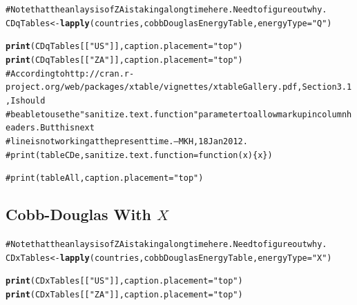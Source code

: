 \documentclass[preprint,authoryear,12pt]{elsarticle}\usepackage{graphicx, color}
\makeatletter
\newcommand{\hlfunctioncall}[1]{\textcolor[rgb]{0.501960784313725,0,0.329411764705882}{\textbf{#1}}}%
\newcommand{\hlstring}[1]{\textcolor[rgb]{0.6,0.6,1}{#1}}%
\newcommand{\hlcomment}[1]{\textcolor[rgb]{0.180392156862745,0.6,0.341176470588235}{#1}}%
\newenvironment{kframe}{%
 \def\at@end@of@kframe{}%
 \ifinner\ifhmode%
  \def\at@end@of@kframe{\end{minipage}}%
  \begin{minipage}{\columnwidth}%
 \fi\fi%
 \def\FrameCommand##1{\hskip\@totalleftmargin \hskip-\fboxsep
 \colorbox{shadecolor}{##1}\hskip-\fboxsep
     \hskip-\linewidth \hskip-\@totalleftmargin \hskip\columnwidth}%
 \MakeFramed {\advance\hsize-\width
   \@totalleftmargin\z@ \linewidth\hsize
   \@setminipage}}%
 {\par\unskip\endMakeFramed%
 \at@end@of@kframe}
\newenvironment{knitrout}{}{} %
\makeatother
\begin{document}
\begin{knitrout}
\color{fgcolor}\begin{kframe}
\begin{alltt}
\hlcomment{# Note that the anlaysis of ZA is taking a long time here. Need to figure out why.}
CDqTables <- \hlfunctioncall{lapply}(countries, cobbDouglasEnergyTable, energyType=\hlstring{"Q"})
\end{alltt}
\end{kframe}
\end{knitrout}


\begin{kframe}
\begin{alltt}
\hlfunctioncall{print}(CDqTables[[\hlstring{"US"}]], caption.placement=\hlstring{"top"})
\hlfunctioncall{print}(CDqTables[[\hlstring{"ZA"}]], caption.placement=\hlstring{"top"})
\hlcomment{# According to http://cran.r-project.org/web/packages/xtable/vignettes/xtableGallery.pdf, Section 3.1, I should }
\hlcomment{# be able to use the "sanitize.text.function" parameter to allow markup in column headers. But this next}
\hlcomment{# line is not working at the present time. --MKH, 18 Jan 2012.}
\hlcomment{# print(tableCDe, sanitize.text.function = function(x)\{x\})}

\hlcomment{#print(tableAll, caption.placement="top")}
\end{alltt}
\end{kframe}


\subsection{Cobb-Douglas With $X$}

\begin{knitrout}
\color{fgcolor}\begin{kframe}
\begin{alltt}
\hlcomment{# Note that the anlaysis of ZA is taking a long time here. Need to figure out why.}
CDxTables <- \hlfunctioncall{lapply}(countries, cobbDouglasEnergyTable, energyType=\hlstring{"X"})
\end{alltt}
\end{kframe}
\end{knitrout}


\begin{kframe}
\begin{alltt}
\hlfunctioncall{print}(CDxTables[[\hlstring{"US"}]], caption.placement=\hlstring{"top"})
\hlfunctioncall{print}(CDxTables[[\hlstring{"ZA"}]], caption.placement=\hlstring{"top"})
\end{alltt}
\end{kframe}
\end{document}
